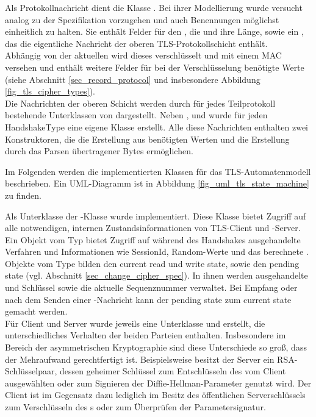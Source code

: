 
Als Protokollnachricht dient die Klasse . Bei ihrer Modellierung wurde versucht analog zu der Spezifikation vorzugehen und auch Benennungen möglichst einheitlich zu halten. Sie enthält Felder für den , die  und ihre Länge, sowie ein , das die eigentliche Nachricht der oberen TLS-Protokollschicht enthält. \\
Abhängig von der aktuellen \ciphersuite{} wird dieses  verschlüsselt und mit einem MAC versehen und enthält weitere Felder für bei der Verschlüsselung benötigte Werte (siehe Abschnitt \ref{sec_record_protocol} und insbesondere Abbildung \ref{fig_tls_cipher_types}). \\
Die Nachrichten der oberen Schicht werden durch für jedes Teilprotokoll bestehende Unterklassen von  dargestellt. Neben ,  und  wurde für jeden HandshakeType eine eigene Klasse erstellt. Alle diese Nachrichten enthalten zwei Konstruktoren, die die Erstellung aus benötigten Werten und die Erstellung durch das Parsen übertragener Bytes ermöglichen. 


Im Folgenden werden die implementierten Klassen für das TLS-Automatenmodell beschrieben. Ein UML-Diagramm ist in Abbildung \ref{fig_uml_tls_state_machine} zu finden.

Als Unterklasse der -Klasse wurde  implementiert. Diese Klasse bietet Zugriff auf alle notwendigen, internen Zustandsinformationen von TLS-Client und -Server. Ein Objekt vom Typ  bietet Zugriff auf während des Handshakes ausgehandelte Verfahren und Informationen wie SessionId, Random-Werte und das berechnete \mastersecret{}. Objekte vom Type  bilden den current read und write state, sowie den pending state (vgl. Abschnitt \ref{sec_change_cipher_spec}). In ihnen werden ausgehandelte \ciphersuite{} und Schlüssel sowie die aktuelle Sequenznummer verwaltet. Bei Empfang oder nach dem Senden einer \changecipherspec{}-Nachricht kann der pending state zum current state gemacht werden.\\
Für Client und Server wurde jeweils eine Unterklasse  und  erstellt, die unterschiedliches Verhalten der beiden Parteien enthalten. Insbesondere im Bereich der asymmetrischen Kryptographie sind diese Unterschiede so groß, dass der Mehraufwand gerechtfertigt ist. Beispielsweise besitzt der Server ein RSA-Schlüsselpaar, dessen geheimer Schlüssel zum Entschlüsseln des vom Client ausgewählten \premastersecret{} oder zum Signieren der Diffie-Hellman-Parameter genutzt wird. Der Client ist im Gegensatz dazu lediglich im Besitz des öffentlichen Serverschlüssels zum Verschlüsseln des \premastersecret{}s oder zum Überprüfen der Parametersignatur.

